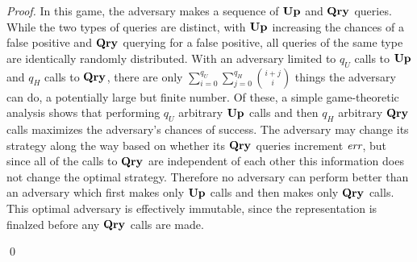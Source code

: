 \begin{proof}
In this game, the adversary makes a sequence of $\mathbf{Up}\hspace{0.5pt}$ and $\mathbf{Qry}\hspace{0.5pt}$ queries. While the two types of queries are distinct, with $\mathbf{Up}\hspace{0.5pt}$ increasing the chances of a false positive and $\mathbf{Qry}\hspace{0.5pt}$ querying for a false positive, all queries of the same type are identically randomly distributed. With an adversary limited to $q_U$ calls to $\mathbf{Up}\hspace{0.5pt}$ and $q_H$ calls to $\mathbf{Qry}\hspace{0.5pt}$, there are only $\sum_{i=0}^{q_U} \sum_{j=0}^{q_H} \binom{i+j}{i}$ things the adversary can do, a potentially large but finite number. Of these, a simple game-theoretic analysis shows that performing $q_U$ arbitrary $\mathbf{Up}\hspace{0.5pt}$ calls and then $q_H$ arbitrary $\mathbf{Qry}\hspace{0.5pt}$ calls maximizes the adversary's chances of success. The adversary may change its strategy along the way based on whether its $\mathbf{Qry}\hspace{0.5pt}$ queries increment $\textit{err}$, but since all of the calls to $\mathbf{Qry}\hspace{0.5pt}$ are independent of each other this information does not change the optimal strategy. Therefore no adversary can perform better than an adversary which first makes only $\mathbf{Up}\hspace{0.5pt}$ calls and then makes only $\mathbf{Qry}\hspace{0.5pt}$ calls. This optimal adversary is effectively immutable, since the representation is finalzed before any $\mathbf{Qry}\hspace{0.5pt}$ calls are made.

\hfill\qed
\end{proof}

